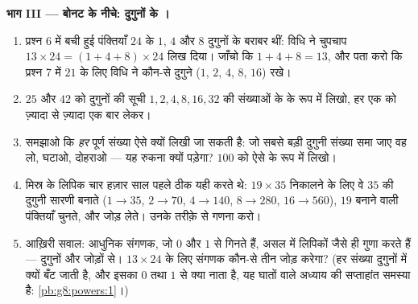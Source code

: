 \begin{problem}
\medskip
\noindent\textbf{भाग III --- बोनट के नीचे: दुगुनों के
।}
\begin{enumerate}[resume]
  \item प्रश्न 6 में बची हुई पंक्तियाँ $24$ के $1$, $4$ और $8$
        दुगुनों के बराबर थीं: विधि ने चुपचाप
        $13 \times 24 = (1 + 4 + 8) \times 24$ लिख दिया। जाँचो कि
        $1 + 4 + 8 = 13$, और पता करो कि प्रश्न 7 में $21$ के लिए
        विधि ने कौन-से दुगुने ($1$, $2$, $4$, $8$, $16$) रखे।
  \item $25$ और $42$ को दुगुनों की सूची $1, 2, 4, 8, 16, 32$ की
        संख्याओं के  के रूप में लिखो, हर एक को ज़्यादा से
        ज़्यादा एक बार लेकर।
  \item समझाओ कि \emph{हर} पूर्ण संख्या ऐसे क्यों लिखी जा सकती
        है: जो सबसे बड़ी दुगुनी संख्या समा जाए वह लो, घटाओ,
        दोहराओ --- यह रुकना क्यों पड़ेगा? $100$ को ऐसे  के
        रूप में लिखो।
  \item मिस्र के लिपिक चार हज़ार साल पहले ठीक यही करते थे:
        $19 \times 35$ निकालने के लिए वे $35$ की दुगुनी सारणी
        बनाते ($1 \to 35$, $2 \to 70$, $4 \to 140$,
        $8 \to 280$, $16 \to 560$), $19$ बनाने वाली पंक्तियाँ
        चुनते, और जोड़ लेते। उनके तरीक़े से गणना करो।
  \item आख़िरी सवाल: आधुनिक संगणक, जो $0$ और $1$ से गिनते हैं,
        असल में लिपिकों जैसे ही गुणा करते हैं --- दुगुनों और
        जोड़ों से। $13 \times 24$ के लिए संगणक कौन-से तीन जोड़
        करेगा? (हर संख्या दुगुनों में क्यों बँट जाती है, और
        इसका $0$ तथा $1$ से क्या नाता है, यह घातों वाले अध्याय
        की सप्ताहांत समस्या है: \cref{pb:g8:powers:1}।)
\end{enumerate}
\end{problem}
